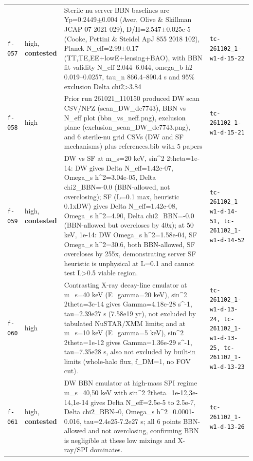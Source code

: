 \documentclass[11pt,a4paper]{article}
\begin{document}
\begin{longtable}{@{}p{}p{}p{}p{}@{}}
\texttt{f-057} & high, \textbf{contested} & Sterile-nu server BBN baselines are Yp=0.2449$\pm$0.004 (Aver, Olive \& Skillman JCAP 07 2021 029), D/H=2.547$\pm$0.025e-5 (Cooke, Pettini \& Steidel ApJ 855 2018 102), Planck N\_eff=2.99$\pm$0.17 (TT,TE,EE+lowE+lensing+BAO), with BBN fit validity N\_eff 2.044--6.044, omega\_b h2 0.019--0.0257, tau\_n 866.4--890.4 s and 95\% exclusion Delta chi2\textgreater{}3.84 & \texttt{tc-261102\_\allowbreak{}1-w1-d-15-22} \\
\texttt{f-058} & high & Prior run 261021\_110150 produced DW scan CSV/NPZ (scan\_DW\_dc7743), BBN vs N\_eff plot (bbn\_vs\_neff.png), exclusion plane (exclusion\_scan\_DW\_dc7743.png), and 6 sterile-nu grid CSVs (DW and SF mechanisms) plus references.bib with 5 papers & \texttt{tc-261102\_\allowbreak{}1-w1-d-15-21} \\
\texttt{f-059} & high, \textbf{contested} & DW vs SF at m\_s=20 keV, sin\textasciicircum{}2 2theta=1e-14: DW gives Delta N\_eff=1.42e-07, Omega\_s h\textasciicircum{}2=3.04e-05, Delta chi2\_BBN=-0.0 (BBN-allowed, not overclosing); SF (L=0.1 max, heuristic 0.1xDW) gives Delta N\_eff=1.42e-08, Omega\_s h\textasciicircum{}2=4.90, Delta chi2\_BBN=-0.0 (BBN-allowed but overcloses by 40x); at 50 keV, 1e-14: DW Omega\_s h\textasciicircum{}2=1.58e-04, SF Omega\_s h\textasciicircum{}2=30.6, both BBN-allowed, SF overcloses by 255x, demonstrating server SF heuristic is unphysical at L=0.1 and cannot test L\textgreater{}0.5 viable region. & \texttt{tc-261102\_\allowbreak{}1-w1-d-14-51,\allowbreak{} tc-261102\_\allowbreak{}1-w1-d-14-52} \\
\texttt{f-060} & high & Contrasting X-ray decay-line emulator at m\_s=40 keV (E\_gamma=20 keV), sin\textasciicircum{}2 2theta=3e-14 gives Gamma=4.18e-28 s\textasciicircum{}-1, tau=2.39e27 s (7.58e19 yr), not excluded by tabulated NuSTAR/XMM limits; and at m\_s=10 keV (E\_gamma=5 keV), sin\textasciicircum{}2 2theta=1e-12 gives Gamma=1.36e-29 s\textasciicircum{}-1, tau=7.35e28 s, also not excluded by built-in limits (whole-halo flux, f\_DM=1, no FOV cut). & \texttt{tc-261102\_\allowbreak{}1-w1-d-13-24,\allowbreak{} tc-261102\_\allowbreak{}1-w1-d-13-25,\allowbreak{} tc-261102\_\allowbreak{}1-w1-d-13-23} \\
\texttt{f-061} & high, \textbf{contested} & DW BBN emulator at high-mass SPI regime m\_s=40,50 keV with sin\textasciicircum{}2 2theta=1e-12,3e-14,1e-14 gives Delta N\_eff=2.5e-5 to 2.5e-7, Delta chi2\_BBN\textasciitilde{}0, Omega\_s h\textasciicircum{}2=0.0001-0.016, tau=2.4e25-7.2e27 s; all 6 points BBN-allowed and not overclosing, confirming BBN is negligible at these low mixings and X-ray/SPI dominates. & \texttt{tc-261102\_\allowbreak{}1-w1-d-13-26} \\

\end{longtable}
\end{document}
